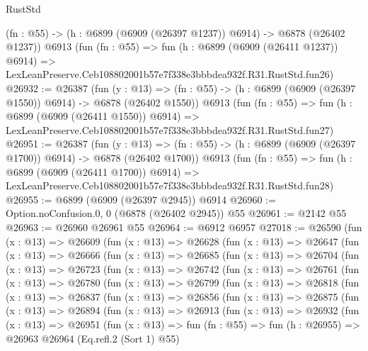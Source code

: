 \begin{lexlean}{RustStd}
\begin{coremodule}
    (fn : @55) -> (h : @6899 (@6909 (@26397 @1237)) @6914) -> @6878 (@26402 @1237))
    @6913
    (fun (fn : @55) =>
    fun (h : @6899 (@6909 (@26411 @1237)) @6914) =>
    LexLeanPreserve.Ceb108802001b57e7f338e3bbbdea932f.R31.RustStd.fun26)
@26932 := @26387
    (fun (y : @13) =>
    (fn : @55) -> (h : @6899 (@6909 (@26397 @1550)) @6914) -> @6878 (@26402 @1550))
    @6913
    (fun (fn : @55) =>
    fun (h : @6899 (@6909 (@26411 @1550)) @6914) =>
    LexLeanPreserve.Ceb108802001b57e7f338e3bbbdea932f.R31.RustStd.fun27)
@26951 := @26387
    (fun (y : @13) =>
    (fn : @55) -> (h : @6899 (@6909 (@26397 @1700)) @6914) -> @6878 (@26402 @1700))
    @6913
    (fun (fn : @55) =>
    fun (h : @6899 (@6909 (@26411 @1700)) @6914) =>
    LexLeanPreserve.Ceb108802001b57e7f338e3bbbdea932f.R31.RustStd.fun28)
@26955 := @6899 (@6909 (@26397 @2945)) @6914
@26960 := Option.noConfusion.{0, 0} (@6878 (@26402 @2945)) @55
@26961 := @2142 @55
@26963 := @26960 @26961 @55
@26964 := @6912 @6957
@27018 := @26590
    (fun (x : @13) =>
    @26609
      (fun (x : @13) =>
      @26628
        (fun (x : @13) =>
        @26647
          (fun (x : @13) =>
          @26666
            (fun (x : @13) =>
            @26685
              (fun (x : @13) =>
              @26704
                (fun (x : @13) =>
                @26723
                  (fun (x : @13) =>
                  @26742
                    (fun (x : @13) =>
                    @26761
                      (fun (x : @13) =>
                      @26780
                        (fun (x : @13) =>
                        @26799
                          (fun (x : @13) =>
                          @26818
                            (fun (x : @13) =>
                            @26837
                              (fun (x : @13) =>
                              @26856
                                (fun (x : @13) =>
                                @26875
                                  (fun (x : @13) =>
                                  @26894
                                    (fun (x : @13) =>
                                    @26913
                                      (fun (x : @13) =>
                                      @26932
                                        (fun (x : @13) =>
                                        @26951
                                          (fun (x : @13) =>
                                          fun (fn : @55) =>
                                          fun (h : @26955) =>
                                          @26963
                                            @26964
                                            (Eq.refl.{2} (Sort 1) @55)

\end{coremodule}
\end{lexlean}
